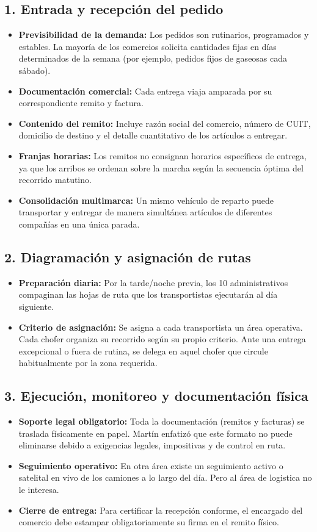 \documentclass[11pt,a4paper]{article}
\begin{document}
\subsection*{1. Entrada y recepción del pedido}
\begin{itemize}
  \item \textbf{Previsibilidad de la demanda:} Los pedidos son rutinarios, programados y estables. La mayoría de los comercios solicita cantidades fijas en días determinados de la semana (por ejemplo, pedidos fijos de gaseosas cada sábado).
  \item \textbf{Documentación comercial:} Cada entrega viaja amparada por su correspondiente remito y factura.
  \item \textbf{Contenido del remito:} Incluye razón social del comercio, número de CUIT, domicilio de destino y el detalle cuantitativo de los artículos a entregar.
  \item \textbf{Franjas horarias:} Los remitos no consignan horarios específicos de entrega, ya que los arribos se ordenan sobre la marcha según la secuencia óptima del recorrido matutino.
  \item \textbf{Consolidación multimarca:} Un mismo vehículo de reparto puede transportar y entregar de manera simultánea artículos de diferentes compañías en una única parada.
\end{itemize}

\subsection*{2. Diagramación y asignación de rutas}
\begin{itemize}
  \item \textbf{Preparación diaria:} Por la tarde/noche previa, los 10 administrativos compaginan las hojas de ruta que los transportistas ejecutarán al día siguiente.
  \item \textbf{Criterio de asignación:} Se asigna a cada transportista un área operativa. Cada chofer organiza su recorrido según su propio criterio. Ante una entrega excepcional o fuera de rutina, se delega en aquel chofer que circule habitualmente por la zona requerida.
\end{itemize}

\subsection*{3. Ejecución, monitoreo y documentación física}
\begin{itemize}
  \item \textbf{Soporte legal obligatorio:} Toda la documentación (remitos y facturas) se traslada físicamente en papel. Martín enfatizó que este formato no puede eliminarse debido a exigencias legales, impositivas y de control en ruta.
  \item \textbf{Seguimiento operativo:} En otra área existe un seguimiento activo o satelital en vivo de los camiones a lo largo del día. Pero al área de logistica no le interesa.
  \item \textbf{Cierre de entrega:} Para certificar la recepción conforme, el encargado del comercio debe estampar obligatoriamente su firma en el remito físico.
\end{itemize}
\end{document}
